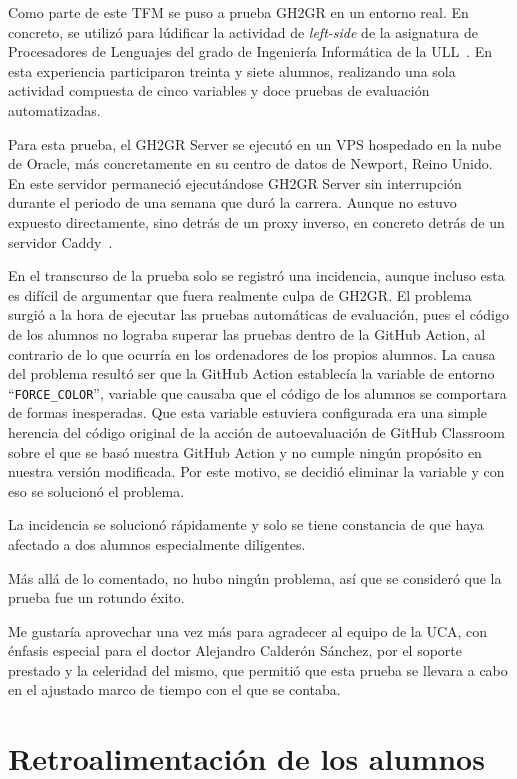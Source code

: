 Como parte de este \acrshort{TFM} se puso a prueba GH2GR en un entorno real. En concreto, se utilizó para lúdificar la actividad de \textit{left-side} de la asignatura de Procesadores de Lenguajes del grado de Ingeniería Informática de la \acrshort{ULL}~\cite{ullplNextraNext}. En esta experiencia participaron treinta y siete alumnos, realizando una sola actividad compuesta de cinco variables y doce pruebas de evaluación automatizadas.

Para esta prueba, el GH2GR Server se ejecutó en un \acrshort{VPS} hospedado en la nube de Oracle, más concretamente en su centro de datos de Newport, Reino Unido. En este servidor permaneció ejecutándose GH2GR Server sin interrupción durante el periodo de una semana que duró la carrera. Aunque no estuvo expuesto directamente, sino detrás de un proxy inverso, en concreto detrás de un servidor Caddy~\cite{caddyserverWelcomeCaddy}.

En el transcurso de la prueba solo se registró una incidencia, aunque incluso esta es difícil de argumentar que fuera realmente culpa de GH2GR. El problema surgió a la hora de ejecutar las pruebas automáticas de evaluación, pues el código de los alumnos no lograba superar las pruebas dentro de la GitHub Action, al contrario de lo que ocurría en los ordenadores de los propios alumnos. La causa del problema resultó ser que la GitHub Action establecía la variable de entorno ``{\tt FORCE\_COLOR}'', variable que causaba que el código de los alumnos se comportara de formas inesperadas. Que esta variable estuviera configurada era una simple herencia del código original de la acción de autoevaluación de GitHub Classroom sobre el que se basó nuestra GitHub Action y no cumple ningún propósito en nuestra versión modificada. Por este motivo, se decidió eliminar la variable y con eso se solucionó el problema.

La incidencia se solucionó rápidamente y solo se tiene constancia de que haya afectado a dos alumnos especialmente diligentes.

Más allá de lo comentado, no hubo ningún problema, así que se consideró que la prueba fue un rotundo éxito.

Me gustaría aprovechar una vez más para agradecer al equipo de la \acrshort{UCA}, con énfasis especial para el doctor Alejandro Calderón Sánchez, por el soporte prestado y la celeridad del mismo, que permitió que esta prueba se llevara a cabo en el ajustado marco de tiempo con el que se contaba.


\section{Retroalimentación de los alumnos}\label{title:feedback}

